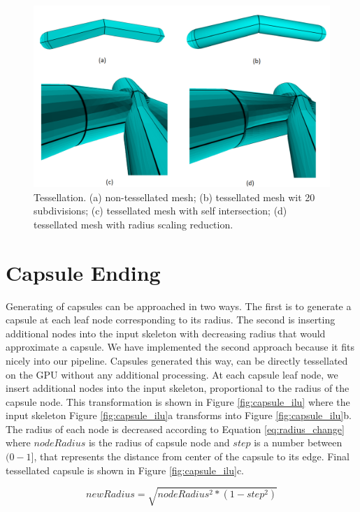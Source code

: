\begin{figure}[ht]
    \centering
    \includegraphics[width=0.9\linewidth]{images/tess_ilu}
    \caption[Tessellation and smoothing]{Tessellation. (a) non-tessellated mesh; (b) tessellated mesh wit 20 subdivisions; (c) tessellated mesh with self intersection; (d) tessellated mesh with radius scaling reduction.}
    \label{fig:tessellation_ilu}
\end{figure}

\section{Capsule Ending}
Generating of capsules can be approached in two ways.
The first is to generate a capsule at each leaf node corresponding to its radius.
The second is inserting additional nodes into the input skeleton with decreasing radius that would approximate a capsule.
We have implemented the second approach because it fits nicely into our pipeline.
Capsules generated this way, can be directly tessellated on the GPU without any additional processing.
At each capsule leaf node, we insert additional nodes into the input skeleton, proportional to the radius of the capsule node.
This transformation is shown in Figure \ref{fig:capsule_ilu} where the input skeleton Figure \ref{fig:capsule_ilu}a transforms into Figure \ref{fig:capsule_ilu}b.
The radius of each node is decreased according to Equation \ref{eq:radius_change} where $nodeRadius$ is the radius of capsule node and $step$ is a number between $(0-1]$, that represents the distance from center of the capsule to its edge.
Final tessellated capsule is shown in Figure \ref{fig:capsule_ilu}c.

\begin{equation}
newRadius = \sqrt{nodeRadius^{2} * (1 - step^{2})}
\label{eq:radius_change}
\end{equation}

